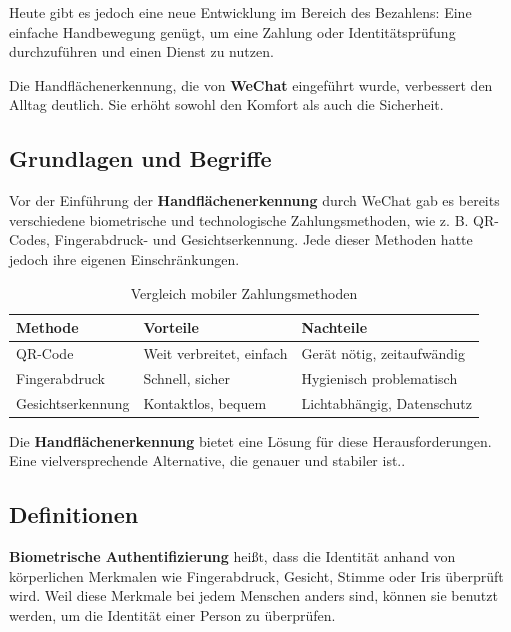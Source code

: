 \documentclass[paper=a4,fontsize=12pt,ngerman]{scrartcl}
\begin{document}
Heute gibt es jedoch eine neue Entwicklung im Bereich des Bezahlens: Eine einfache Handbewegung genügt, um eine Zahlung oder Identitätsprüfung durchzuführen und einen Dienst zu nutzen.

Die Handflächenerkennung, die von \textbf{WeChat} eingeführt wurde, verbessert den Alltag deutlich. Sie erhöht sowohl den Komfort als auch die Sicherheit.


\subsection{Grundlagen und Begriffe}

Vor der Einführung der \textbf{Handflächenerkennung} durch WeChat gab es bereits 
verschiedene biometrische und technologische Zahlungsmethoden, wie z. B. QR-Codes, 
Fingerabdruck- und Gesichtserkennung. Jede dieser Methoden hatte jedoch ihre eigenen 
Einschränkungen.

\begin{table}[h]
\centering
\begin{tabular}{|l|p{5cm}|p{5cm}|}
\hline
\textbf{Methode} & \textbf{Vorteile} & \textbf{Nachteile} \\ 
\hline
QR-Code & Weit verbreitet, einfach & Gerät nötig, zeitaufwändig \\
\hline
Fingerabdruck & Schnell, sicher & Hygienisch problematisch \\
\hline
Gesichtserkennung & Kontaktlos, bequem & Lichtabhängig, Datenschutz \\
\hline
\end{tabular}
\caption{Vergleich mobiler Zahlungsmethoden}
\label{tab:zahlungsmethoden}
\end{table}

Die \textbf{Handflächenerkennung} bietet eine Lösung für diese Herausforderungen.
Eine vielversprechende Alternative, die genauer und stabiler ist.\cite{tang2022wechat}. 

\vspace*{1.5cm}

\subsection{Definitionen}
\textbf{Biometrische Authentifizierung} heißt, dass die Identität anhand von körperlichen Merkmalen wie Fingerabdruck, Gesicht, Stimme oder Iris überprüft wird. Weil diese Merkmale bei jedem Menschen anders sind, können sie benutzt werden, um die Identität einer Person zu überprüfen. \cite{geeksforgeeks2025palm}
\end{document}
